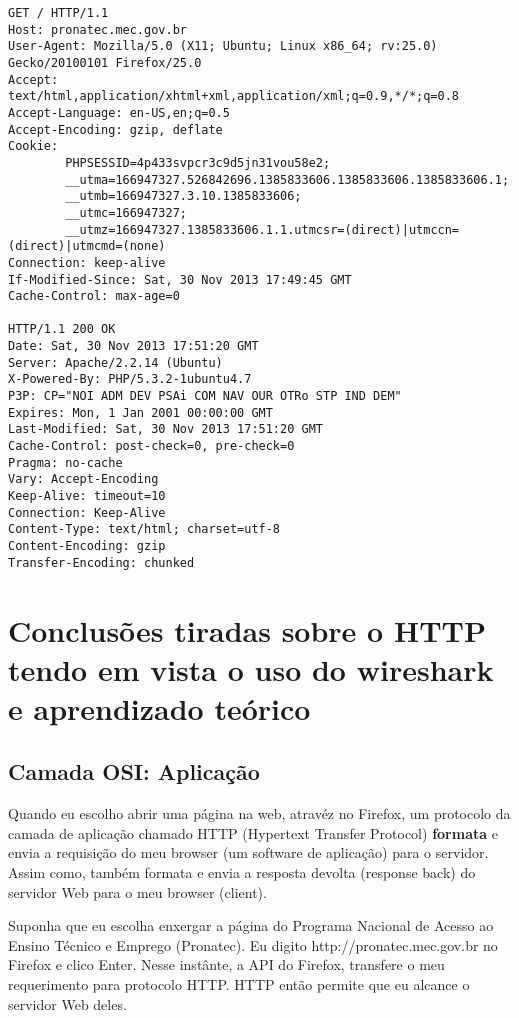 \documentclass[13pt, a4paper]{article}
\begin{document}
\begin{verbatim}
GET / HTTP/1.1
Host: pronatec.mec.gov.br
User-Agent: Mozilla/5.0 (X11; Ubuntu; Linux x86_64; rv:25.0) Gecko/20100101 Firefox/25.0
Accept: text/html,application/xhtml+xml,application/xml;q=0.9,*/*;q=0.8
Accept-Language: en-US,en;q=0.5
Accept-Encoding: gzip, deflate
Cookie:
        PHPSESSID=4p433svpcr3c9d5jn31vou58e2;
        __utma=166947327.526842696.1385833606.1385833606.1385833606.1;
        __utmb=166947327.3.10.1385833606;
        __utmc=166947327;
        __utmz=166947327.1385833606.1.1.utmcsr=(direct)|utmccn=(direct)|utmcmd=(none)
Connection: keep-alive
If-Modified-Since: Sat, 30 Nov 2013 17:49:45 GMT
Cache-Control: max-age=0

HTTP/1.1 200 OK
Date: Sat, 30 Nov 2013 17:51:20 GMT
Server: Apache/2.2.14 (Ubuntu)
X-Powered-By: PHP/5.3.2-1ubuntu4.7
P3P: CP="NOI ADM DEV PSAi COM NAV OUR OTRo STP IND DEM"
Expires: Mon, 1 Jan 2001 00:00:00 GMT
Last-Modified: Sat, 30 Nov 2013 17:51:20 GMT
Cache-Control: post-check=0, pre-check=0
Pragma: no-cache
Vary: Accept-Encoding
Keep-Alive: timeout=10
Connection: Keep-Alive
Content-Type: text/html; charset=utf-8
Content-Encoding: gzip
Transfer-Encoding: chunked
\end{verbatim}

\pagebreak
\section{Conclusões tiradas sobre o HTTP tendo em vista o uso do wireshark e aprendizado teórico}

\subsection{Camada OSI:  Aplicação}

Quando eu escolho abrir uma página na web, atravéz no Firefox, um protocolo da camada de aplicação
chamado HTTP (Hypertext Transfer Protocol) \textbf{formata} e envia a requisição  do meu browser (um software de aplicação)
para o servidor. Assim como, também formata e envia a resposta devolta (response back) do servidor Web para o meu browser (client). \cite{rfc2916}

Suponha que eu escolha enxergar a página do Programa Nacional de Acesso ao Ensino Técnico e Emprego (Pronatec).
Eu digito http://pronatec.mec.gov.br no Firefox e clico Enter. Nesse instânte, a API do Firefox, transfere o meu requerimento
para protocolo HTTP. HTTP então permite que eu alcance o servidor Web deles.
\end{document}
